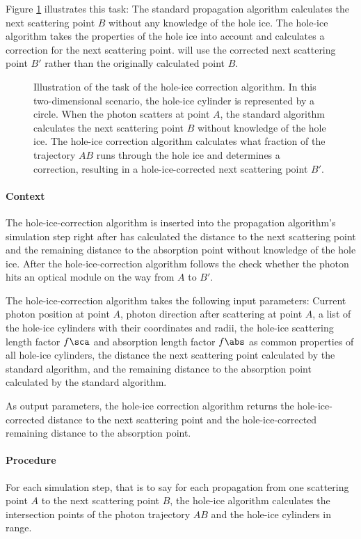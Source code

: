 Figure \ref{fig:Edahi9sh} illustrates this task: The standard \clsim propagation algorithm calculates the next scattering point $B$ without any knowledge of the hole ice. The hole-ice algorithm takes the properties of the hole ice into account and calculates a correction for the next scattering point. \clsim will use the corrected next scattering point $B'$ rather than the originally calculated point $B$.

\begin{figure}[htbp]
  \caption{Illustration of the task of the hole-ice correction algorithm. In this two-dimensional scenario, the hole-ice cylinder is represented by a circle. When the photon scatters at point $A$, the standard \clsim algorithm calculates the next scattering point $B$ without knowledge of the hole ice. The hole-ice correction algorithm calculates what fraction of the trajectory $AB$ runs through the hole ice and determines a correction, resulting in a hole-ice-corrected next scattering point $B'$.}
  \label{fig:Edahi9sh}
\end{figure}

\paragraph{Context} The hole-ice-correction algorithm is inserted into the \clsim propagation algorithm's simulation step right after \clsim has calculated the distance to the next scattering point and the remaining distance to the absorption point without knowledge of the hole ice. After the hole-ice-correction algorithm follows the check whether the photon hits an optical module on the way from $A$ to $B'$.

The hole-ice-correction algorithm takes the following input parameters: Current photon position at point $A$, photon direction after scattering at point $A$, a list of the hole-ice cylinders with their coordinates and radii, the hole-ice scattering length factor $f\sca$ and absorption length factor $f\abs$ as common properties of all hole-ice cylinders, the distance the next scattering point calculated by the standard algorithm, and the remaining distance to the absorption point calculated by the standard algorithm.

As output parameters, the hole-ice correction algorithm returns the hole-ice-corrected distance to the next scattering point and the hole-ice-corrected remaining distance to the absorption point.

\paragraph{Procedure} For each simulation step, that is to say for each propagation from one scattering point $A$ to the next scattering point $B$, the hole-ice algorithm calculates the intersection points of the photon trajectory $AB$ and the hole-ice cylinders in range.

